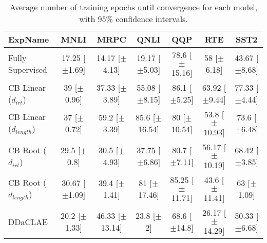 \begin{table*}[ht]
\centering
\begingroup\small
\begin{tabular}{lcccccc}
  \hline
ExpName & MNLI & MRPC & QNLI & QQP & RTE & SST2 \\ 
  \hline
Fully Supervised & 17.25 [$\pm$1.69] & 14.17 [$\pm$4.13] & 19.17 [$\pm$5.03] & 78.6 [$\pm$15.16] & 58 [$\pm$6.18] & 43.67 [$\pm$8.68] \\ 
  CB Linear ($d_{irt}$) & 39 [$\pm$0.96] & 37.33 [$\pm$3.89] & 55.08 [$\pm$8.15] & 86.1 [$\pm$5.25] & 63.92 [$\pm$9.44] & 77.33 [$\pm$4.44] \\ 
  CB Linear ($d_{length}$) & 37 [$\pm$0.72] & 59.2 [$\pm$3.39] & 85.6 [$\pm$16.54] & 80 [$\pm$10.54] & 53.8 [$\pm$10.93] & 73.6 [$\pm$6.48] \\ 
  CB Root ($d_{irt}$) & 29.5 [$\pm$0.8] & 30.5 [$\pm$4.93] & 37.75 [$\pm$6.86] & 80.7 [$\pm$7.11] & 56.17 [$\pm$10.19] & 68.42 [$\pm$3.85] \\ 
  CB Root ($d_{length}$) & 30.67 [$\pm$1.09] & 39.4 [$\pm$1.41] & 81 [$\pm$17.46] & 85.25 [$\pm$11.71] & 43.6 [$\pm$11.41] & 63 [$\pm$1.09] \\ 
  DDaCLAE & 20.2 [$\pm$1.33] & 46.33 [$\pm$13.14] & 23.8 [$\pm$2] & 68.6 [$\pm$14.8] & 26.17 [$\pm$14.29] & 50.33 [$\pm$6.68] \\ 
   \hline
\end{tabular}
\endgroup
\caption{Average number of training epochs until convergence for each model, with 95\% confidence intervals.} 
\label{tab:epoch_lstm-True}
\end{table*}
